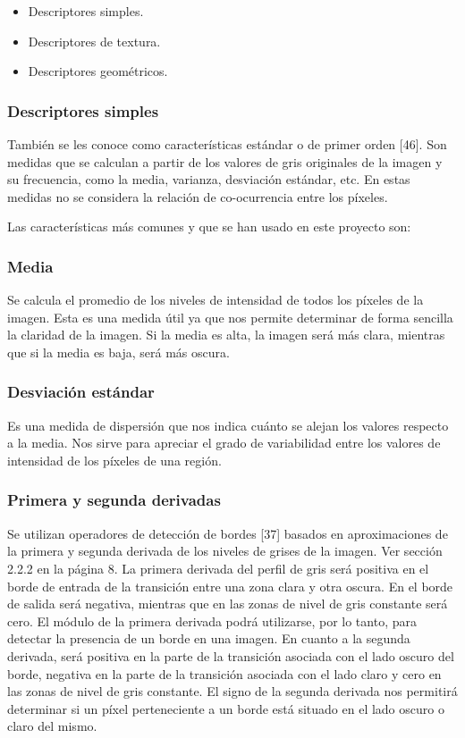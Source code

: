 \begin{itemize}
\item Descriptores simples.
\item Descriptores de textura.
\item Descriptores geométricos.
\end{itemize}

\subsubsection{Descriptores simples}
También se les conoce como características estándar o de primer orden [46]. Son medidas que
se calculan a partir de los valores de gris originales de la imagen y su frecuencia, como la media, varianza, desviación estándar, etc. En estas medidas no se considera la relación de co-ocurrencia entre los píxeles.

Las características más comunes y que se han usado en este proyecto son:

\subsubsection*{Media}
Se calcula el promedio de los niveles de intensidad de todos los píxeles de la imagen. Esta es una medida útil ya que nos permite determinar de forma sencilla la claridad de la imagen. Si la media es alta, la imagen será más clara, mientras que si la media es baja, será más oscura.

\subsubsection*{Desviación estándar}
Es una medida de dispersión que nos indica cuánto se alejan los valores respecto a la media. Nos sirve para apreciar el grado de variabilidad entre los valores de intensidad de los píxeles de una región.

\subsubsection*{Primera y segunda derivadas}
Se utilizan operadores de detección de bordes [37] basados en aproximaciones de la primera y segunda derivada de los niveles de grises de la imagen. Ver sección 2.2.2 en la página 8. La primera derivada del perfil de gris será positiva en el borde de entrada de la transición entre una zona clara y otra oscura. En el borde de salida será negativa, mientras que en las zonas de nivel de gris constante será cero. El módulo de la primera derivada podrá utilizarse, por lo tanto, para detectar la presencia de un borde en una imagen. En cuanto a la segunda derivada, será positiva en la parte de la transición asociada con el lado oscuro del borde, negativa en la parte de la transición asociada con el lado claro y cero en las zonas de nivel de gris constante. El signo de la segunda derivada nos permitirá determinar si un píxel perteneciente a un borde está situado en el lado oscuro o claro del mismo.


